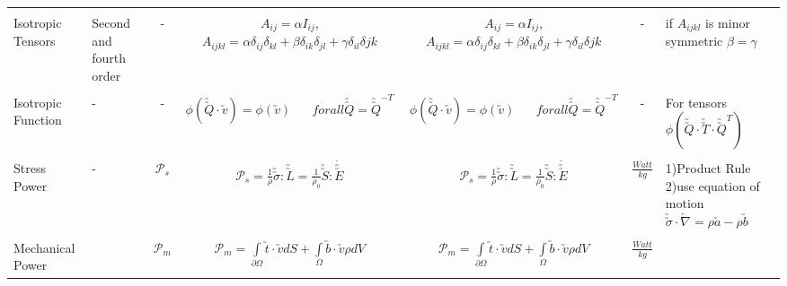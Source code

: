 \documentclass[10pt]{article}
\begin{document}
\begin{center}
\begin{tabular}{l m{3in} c c c c m{5in}}
\hline
\\[-1ex]
Isotropic  Tensors
&%
Second and fourth order
&%
-
&%
$A_{ij}=\alpha I_{ij}$,   $A_{ijkl}=\alpha\delta_{ij}\delta_{kl}+\beta\delta_{ik}\delta_{jl}+\gamma\delta_{il}\delta{jk}$
&%
$A_{ij}=\alpha I_{ij}$,   $A_{ijkl}=\alpha\delta_{ij}\delta_{kl}+\beta\delta_{ik}\delta_{jl}+\gamma\delta_{il}\delta{jk}$
&%
-
&%
if $A_{ijkl}$ is minor symmetric $\beta=\gamma$
\\[1ex]
\hline
\\[-1ex]
Isotropic Function
&%
-
&%
-
&%
$\phi(\utilde{\utilde{Q}}\cdot\utilde{v}) = \phi(\utilde{v})\hspace{20pt}for all \utilde{\utilde{Q}}=\utilde{\utilde{Q}}^{-T}$
&%
$\phi(\utilde{\utilde{Q}}\cdot\utilde{v}) = \phi(\utilde{v})\hspace{20pt}for all \utilde{\utilde{Q}}=\utilde{\utilde{Q}}^{-T}$
&%
-
&%
For tensors $\phi(\utilde{\utilde{Q}}\cdot\utilde{\utilde{T}}\cdot\utilde{\utilde{Q}}^{T})$
\\[1ex]
\hline
\\[-1ex]
Stress Power
&%
-
&%
$ \mathcal{P}_{s} $
&%
$ \mathcal{P}_{s} = \frac{1}{\rho}\utilde{\utilde{\sigma}}:\utilde{\utilde{L}}=\frac{1}{\rho_{0}}\utilde{\utilde{S}}:\dot{\utilde{\utilde{E}}}$
&%
$ \mathcal{P}_{s} = \frac{1}{\rho}\utilde{\utilde{\sigma}}:\utilde{\utilde{L}}=\frac{1}{\rho_{0}}\utilde{\utilde{S}}:\dot{\utilde{\utilde{E}}}$
&%
$ \frac{Watt}{kg} $
&%
1)Product Rule 2)use equation of motion $\utilde{\utilde{\sigma}}\cdot\overleftarrow{\nabla} = \rho\utilde{a}-\rho\utilde{b}$
\\[1ex]
\hline
\\[-1ex]
Mechanical Power
&%

&%
$ \mathcal{P}_{m} $
&%
$ \mathcal{P}_{m} =\int\limits_{\partial \Omega}\utilde{t}\cdot\utilde{v}dS + \int\limits_{\Omega}\utilde{b}\cdot\utilde{v}\rho dV$
&%
$ \mathcal{P}_{m} =\int\limits_{\partial \Omega}\utilde{t}\cdot\utilde{v}dS + \int\limits_{\Omega}\utilde{b}\cdot\utilde{v}\rho dV$
&%
$ \frac{Watt}{kg} $
&%
 

\end{tabular}
\end{center}
\end{document}
